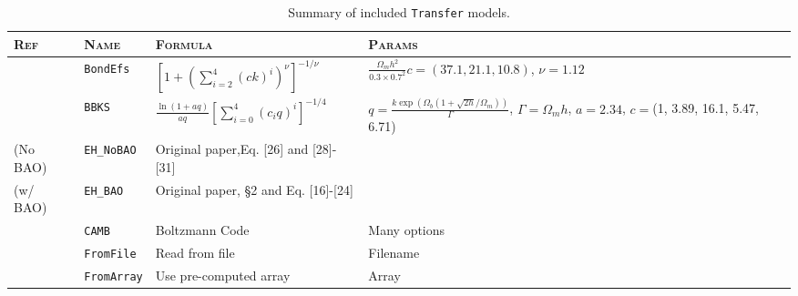 \documentclass[5p,aas_macros]{elsarticle}
\newcommand{\bd}[1]{\textcolor{purple}{\textbf{[BD: #1]}}}
\begin{document}




\begin{table}
\centering
 {\tabulinesep=1.3mm
\begin{tabu}{X[1.5l]X[1l]X[3l]X[3l]} 
\toprule[0.05cm]
\textsc{Ref} & \textsc{Name} & \textsc{Formula} & \textsc{Params} \\
\midrule[0.05cm]
\citet{Bond1984} & \texttt{BondEfs} & $\left[1 + \left(\sum_{i=2}^4 (ck)^i \right)^\nu\right]^{-1/\nu}$ & $\displaystyle \frac{\Omega_m h^2}{0.3\times 0.7^2} c = (37.1,21.1,10.8)$, $\nu=1.12$ \\
\citet{Bardeen1986} & \texttt{BBKS} & $\displaystyle \frac{\ln(1+aq)}{aq} \left[\sum_{i=0}^4 (c_i q)^i\right]^{-1/4}$ & $\displaystyle q=\frac{k\exp(\Omega_b(1 + \sqrt{2h}/\Omega_m))}{\Gamma}$, $\Gamma = \Omega_mh$,  $a=2.34$, $c=$(1, 3.89, 16.1, 5.47, 6.71) \\
\citet{Eisenstein1998} (No BAO) & \texttt{EH\_NoBAO} & Original paper,Eq. [26] and [28]-[31] & \\
\citet{Eisenstein1998} (w/ BAO) & \texttt{EH\_BAO} & Original paper, \S 2 and Eq. [16]-[24] & \\
\citet{Lewis2000} & \texttt{CAMB} & Boltzmann Code & Many options \\
 & \texttt{FromFile} & Read from file & Filename \\
 & \texttt{FromArray} & Use pre-computed array & Array \\
 
\bottomrule[0.05cm]
\end{tabu}}
\caption{Summary of included \texttt{Transfer} models.}
\label{tab:models_transfer}
\end{table}
\end{document}
